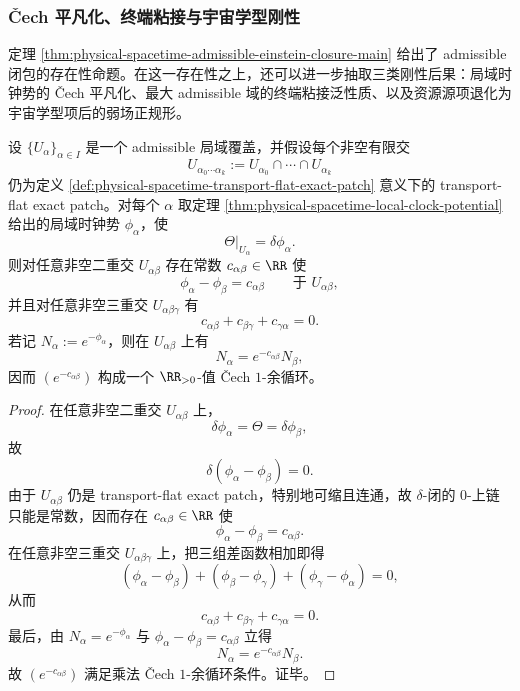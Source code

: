 \subsubsection{\v{C}ech 平凡化、终端粘接与宇宙学型刚性}

定理 \ref{thm:physical-spacetime-admissible-einstein-closure-main} 给出了 admissible 闭包的存在性命题。在这一存在性之上，还可以进一步抽取三类刚性后果：局域时钟势的 \v{C}ech 平凡化、最大 admissible 域的终端粘接泛性质、以及资源源项退化为宇宙学型项后的弱场正规形。

\begin{theorem}\label{thm:physical-spacetime-clock-potential-cech-cocycle}
设 \(\{U_\alpha\}_{\alpha\in I}\) 是一个 admissible 局域覆盖，并假设每个非空有限交
\[
U_{\alpha_0\cdots\alpha_k}:=U_{\alpha_0}\cap\cdots\cap U_{\alpha_k}
\]
仍为定义 \ref{def:physical-spacetime-transport-flat-exact-patch} 意义下的 transport-flat exact patch。对每个 \(\alpha\) 取定理 \ref{thm:physical-spacetime-local-clock-potential} 给出的局域时钟势 \(\phi_\alpha\)，使
\[
\Theta|_{U_\alpha}=\delta\phi_\alpha.
\]
则对任意非空二重交 \(U_{\alpha\beta}\) 存在常数 \(c_{\alpha\beta}\in\RR\) 使
\[
\phi_\alpha-\phi_\beta=c_{\alpha\beta}
\qquad\text{于 }U_{\alpha\beta},
\]
并且对任意非空三重交 \(U_{\alpha\beta\gamma}\) 有
\[
c_{\alpha\beta}+c_{\beta\gamma}+c_{\gamma\alpha}=0.
\]
若记 \(N_\alpha:=e^{-\phi_\alpha}\)，则在 \(U_{\alpha\beta}\) 上有
\[
N_\alpha=e^{-c_{\alpha\beta}}N_\beta,
\]
因而 \((e^{-c_{\alpha\beta}})\) 构成一个 \(\RR_{>0}\)-值 \v{C}ech \(1\)-余循环。
\end{theorem}
\begin{proof}
在任意非空二重交 \(U_{\alpha\beta}\) 上，
\[
\delta\phi_\alpha=\Theta=\delta\phi_\beta,
\]
故
\[
\delta(\phi_\alpha-\phi_\beta)=0.
\]
由于 \(U_{\alpha\beta}\) 仍是 transport-flat exact patch，特别地可缩且连通，故 \(\delta\)-闭的 \(0\)-上链只能是常数，因而存在 \(c_{\alpha\beta}\in\RR\) 使
\[
\phi_\alpha-\phi_\beta=c_{\alpha\beta}.
\]
在任意非空三重交 \(U_{\alpha\beta\gamma}\) 上，把三组差函数相加即得
\[
(\phi_\alpha-\phi_\beta)+(\phi_\beta-\phi_\gamma)+(\phi_\gamma-\phi_\alpha)=0,
\]
从而
\[
c_{\alpha\beta}+c_{\beta\gamma}+c_{\gamma\alpha}=0.
\]
最后，由 \(N_\alpha=e^{-\phi_\alpha}\) 与 \(\phi_\alpha-\phi_\beta=c_{\alpha\beta}\) 立得
\[
N_\alpha=e^{-c_{\alpha\beta}}N_\beta.
\]
故 \((e^{-c_{\alpha\beta}})\) 满足乘法 \v{C}ech \(1\)-余循环条件。证毕。
\end{proof}

